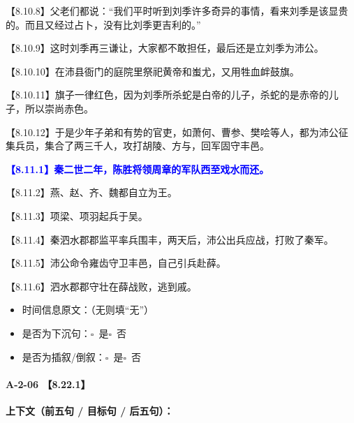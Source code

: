 \documentclass[fontset=none,11pt,a4paper]{ctexart}
\newcommand{\answerline}[1]{\underline{\hspace{#1}}}
\newcommand{\choicebox}[1]{$\square$~#1}
\begin{document}
\noindent 【8.10.8】父老们都说：“我们平时听到刘季许多奇异的事情，看来刘季是该显贵的。而且又经过占卜，没有比刘季更吉利的。”\par
\noindent 【8.10.9】这时刘季再三谦让，大家都不敢担任，最后还是立刘季为沛公。\par
\noindent 【8.10.10】在沛县衙门的庭院里祭祀黄帝和蚩尤，又用牲血衅鼓旗。\par
\noindent 【8.10.11】旗子一律红色，因为刘季所杀蛇是白帝的儿子，杀蛇的是赤帝的儿子，所以崇尚赤色。\par
\noindent 【8.10.12】于是少年子弟和有势的官吏，如萧何、曹参、樊哙等人，都为沛公征集兵员，集合了两三千人，攻打胡陵、方与，回军固守丰邑。\par
\noindent \textcolor{blue}{\textbf{【8.11.1】秦二世二年，陈胜将领周章的军队西至戏水而还。}}\par
\noindent 【8.11.2】燕、赵、齐、魏都自立为王。\par
\noindent 【8.11.3】项梁、项羽起兵于吴。\par
\noindent 【8.11.4】秦泗水郡郡监平率兵围丰，两天后，沛公出兵应战，打败了秦军。\par
\noindent 【8.11.5】沛公命令雍齿守卫丰邑，自己引兵赴薛。\par
\noindent 【8.11.6】泗水郡郡守壮在薛战败，逃到戚。\par

\begin{itemize}
  \item 时间信息原文：\answerline{7.5cm}（无则填“无”）
  \item 是否为下沉句：\choicebox{是}\quad \choicebox{否}
  \item 是否为插叙/倒叙：\choicebox{是}\quad \choicebox{否}
\end{itemize}

\paragraph{A-2-06 \quad 【8.22.1】}
\textbf{上下文（前五句 / 目标句 / 后五句）：}
\end{document}
